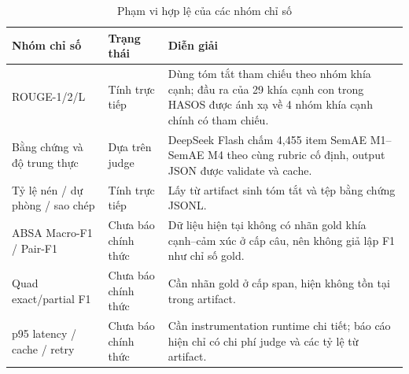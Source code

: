 \begin{table}[H]
\centering
\caption{Phạm vi hợp lệ của các nhóm chỉ số}
\label{tab:metric-availability}
\begin{tabularx}{\textwidth}{l l X}
\toprule
\textbf{Nhóm chỉ số} & \textbf{Trạng thái} & \textbf{Diễn giải} \\
\midrule
ROUGE-1/2/L & Tính trực tiếp & Dùng tóm tắt tham chiếu theo nhóm khía cạnh; đầu ra của 29 khía cạnh con trong HASOS được ánh xạ về 4 nhóm khía cạnh chính có tham chiếu. \\
Bằng chứng và độ trung thực & Dựa trên judge & DeepSeek Flash chấm 4,455 item SemAE M1--SemAE M4 theo cùng rubric cố định, output JSON được validate và cache. \\
Tỷ lệ nén / dự phòng / sao chép & Tính trực tiếp & Lấy từ artifact sinh tóm tắt và tệp bằng chứng JSONL. \\
ABSA Macro-F1 / Pair-F1 & Chưa báo chính thức & Dữ liệu hiện tại không có nhãn gold khía cạnh--cảm xúc ở cấp câu, nên không giả lập F1 như chỉ số gold. \\
Quad exact/partial F1 & Chưa báo chính thức & Cần nhãn gold ở cấp span, hiện không tồn tại trong artifact. \\
p95 latency / cache / retry & Chưa báo chính thức & Cần instrumentation runtime chi tiết; báo cáo hiện chỉ có chi phí judge và các tỷ lệ từ artifact. \\
\bottomrule
\end{tabularx}
\end{table}
